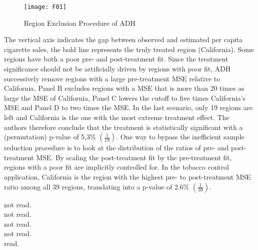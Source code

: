 \begin{figure}[H]
	\centering
	\texttt{[image: F01]}
	\caption{Region Exclusion Procedure of ADH}
	\label{F_01}
\end{figure}

The vertical axis indicates the gap between observed and estimated  per capita cigarette sales, the bold line represents the truly treated region (California). Some regions have both a poor pre- and post-treatment fit. Since the treatment significance should not be artificially driven by regions with poor fit, \ac{ADH} successively remove regions with a large pre-treatment \ac{MSE} relative to California. Panel B excludes regions with a \ac{MSE} that is more than 20 times as large the \ac{MSE} of California, Panel C lowers the cutoff to five times California's \ac{MSE} and Panel D to  two times the \ac{MSE}. In the last scenario, only 19 regions are left and California is the one with the most extreme treatment effect. The authors therefore conclude that the treatment is statistically significant with a (permutation) p-value of 5,3\% $\left(  \frac{1}{19} \right) $. One way to bypass the inefficient sample reduction procedure is to look at the distribution of the ratios of pre- and post-treatment \ac{MSE}. By scaling the post-treatment fit by the pre-treatment fit, regions with a poor fit are implicitly controlled for. In the tobacco control application, California is the region with the highest pre- to post-treatment \ac{MSE} ratio among all 39 regions, translating into a p-value of 2.6\% $\left(  \frac{1}{39} \right) $. 

\cite{andrews:2003} not read. \\
\cite{chernozhukov:2019} not read.\\
\cite{chernozhukov:2021} not read. \\
\cite{firpo:2018} not read. \\
\cite{hahn:2017} read.\\
\cite{breitung:2021}








